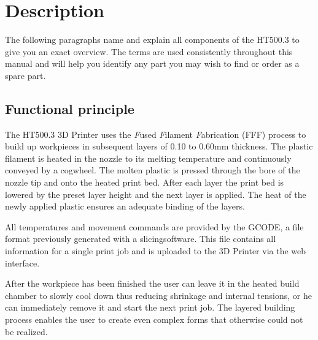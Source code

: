 \section{Description}

The following paragraphs name and explain all components of the HT500.3 to give you an exact overview. The terms are used consistently throughout this manual and will help you identify any part you may wish to find or order as a spare part. 



\subsection{Functional principle}

The HT500.3 3D Printer uses the \emph{F}used \emph{F}ilament \emph{F}abrication (FFF) process to build up workpieces in subsequent layers of 0.10 to 0.60mm thickness. The plastic filament is heated in the nozzle to its melting temperature and continuously conveyed by a cogwheel. The molten plastic is pressed through the bore of the nozzle tip and onto the heated print bed. After each layer the print bed is lowered by the preset layer height and the next layer is applied. The heat of the newly applied plastic ensures an adequate binding of the layers.

All temperatures and movement commands are provided by the GCODE, a file format previously generated with a \dq slicing\dq software. This file contains all information for a single print job and is uploaded to the 3D Printer via the web interface.

After the workpiece has been finished the user can leave it in the heated build chamber to slowly cool down thus reducing shrinkage and internal tensions, or he can immediately remove it and start the next print job. The layered building process enables the user to create even complex forms that otherwise could not be realized. 

